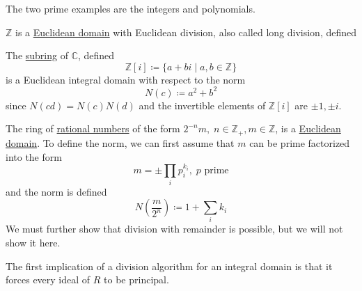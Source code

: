   The two prime examples are the integers and polynomials. 

  \begin{example}[Integers]
    \label{ex:integers}
    $\mathbb{Z}$ is a \hyperref[def:euclidean-domain]{Euclidean domain} with Euclidean division, also called long division, defined 

    \begin{center}
    \end{center}
  \end{example}

  \begin{example}
    \label{ex:gaussian-integers-2}
    The \hyperref[def:subring]{subring} of $\mathbb{C}$, defined
    \begin{equation}
      \mathbb{Z}[i] \coloneqq \{ a + b i \mid a, b \in \mathbb{Z} \}
    \end{equation}
    is a Euclidean integral domain with respect to the norm 
    \begin{equation}
      N(c) \coloneqq a^2 + b^2
    \end{equation}
    since $N(c d) = N(c) N(d)$ and the invertible elements of $\mathbb{Z}[i]$ are $\pm 1, \pm i$. 
  \end{example}

  \begin{example}
    \label{ex:dyadic-rationals}
    The ring of \hyperref[st-thm:rational-numbers]{rational numbers} of the form $2^{-n} m, \; n \in \mathbb{Z}_+, m \in \mathbb{Z}$, is a \hyperref[def:euclidean-domain]{Euclidean domain}. To define the norm, we can first assume that $m$ can be prime factorized into the form 
    \begin{equation}
      m = \pm \prod_{i} p_{i}^{k_i}, \; p \text{ prime}
    \end{equation}
    and the norm is defined 
    \begin{equation}
      N(\frac{m}{2^n}) \coloneqq 1 + \sum_i k_i
    \end{equation}
    We must further show that division with remainder is possible, but we will not show it here. 
  \end{example}

  The first implication of a division algorithm for an integral domain is that it forces every ideal of $R$ to be principal. 

